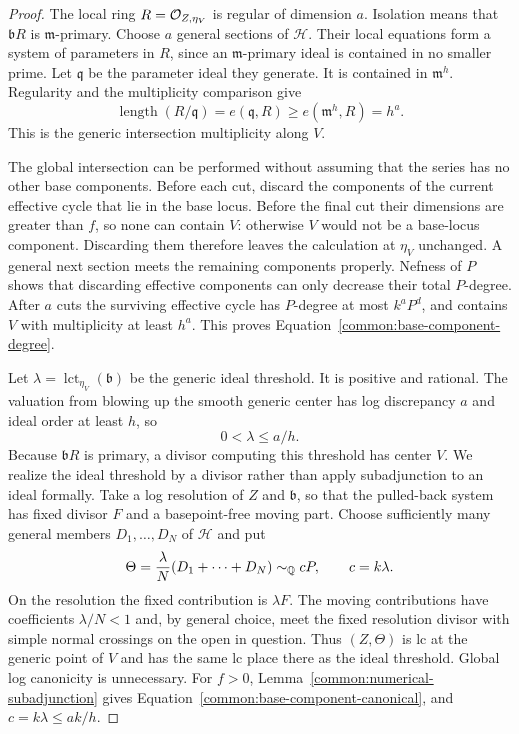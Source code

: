 \begin{proof}
The local ring $R=\mathcal{O}_{Z,\eta_V}$ is regular of dimension $a$.
Isolation means that $\mathfrak bR$ is $\mathfrak m$-primary.
Choose $a$ general sections of $\mathcal H$. Their local equations
form a system of parameters in $R$, since an $\mathfrak m$-primary
ideal is contained in no smaller prime. Let $\mathfrak q$ be the
parameter ideal they generate. It is contained in $\mathfrak m^h$.
Regularity and the multiplicity comparison give
\[
 \operatorname{length}(R/\mathfrak q)
 =e(\mathfrak q,R)\geq e(\mathfrak m^h,R)=h^a.
\]
This is the generic intersection multiplicity along $V$.

The global intersection can be performed without assuming that
the series has no other base components. Before each cut, discard
the components of the current effective cycle that lie in the
base locus. Before the final cut their dimensions are greater
than $f$, so none can contain $V$: otherwise $V$ would not be a
base-locus component. Discarding them therefore leaves the
calculation at $\eta_V$ unchanged. A general next section meets
the remaining components properly. Nefness of $P$ shows that
discarding effective components can only decrease their total
$P$-degree. After $a$ cuts the surviving effective cycle has
$P$-degree at most $k^aP^d$, and contains $V$ with multiplicity at
least $h^a$. This proves Equation~\eqref{common:base-component-degree}.

Let $\lambda=\operatorname{lct}_{\eta_V}(\mathfrak b)$ be the generic ideal
threshold. It is positive and rational. The valuation from
blowing up the smooth generic center has log discrepancy $a$
and ideal order at least $h$, so
\[
 0<\lambda\leq a/h.
\]
Because $\mathfrak bR$ is primary, a divisor computing this
threshold has center $V$. We realize the ideal threshold by a
divisor rather than apply subadjunction to an ideal formally.
Take a log resolution of $Z$ and $\mathfrak b$, so that the
pulled-back system has fixed divisor $F$ and a basepoint-free
moving part. Choose sufficiently many general members
$D_1,\ldots,D_N$ of $\mathcal H$ and put
\[
 \Theta=\frac{\lambda}{N}(D_1+\cdots+D_N)
 \sim_{\mathbb{Q}}cP,\qquad c=k\lambda.
\]
On the resolution the fixed contribution is $\lambda F$.
The moving contributions have coefficients $\lambda/N<1$ and,
by general choice, meet the fixed resolution divisor with simple
normal crossings on the open in question. Thus $(Z,\Theta)$ is
lc at the generic point of $V$ and has the same lc place there
as the ideal threshold. Global log canonicity is unnecessary.
For $f>0$, Lemma~\ref{common:numerical-subadjunction} gives
Equation~\eqref{common:base-component-canonical}, and
$c=k\lambda\leq ak/h$.
\end{proof}

